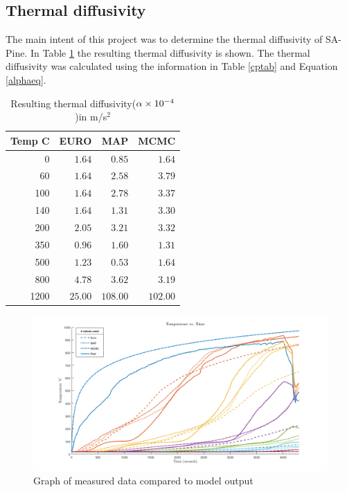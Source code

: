 \subsection{Thermal diffusivity}
The main intent of this project was to determine the thermal diffusivity of SA-Pine. 
In Table \ref{diffrestab} the resulting thermal diffusivity is shown.
The thermal diffusivity was calculated using the information in Table \ref{cptab} and Equation \ref{alphaeq}.

\begin{table}[H]
\centering
	\caption{Resulting thermal diffusivity($\alpha \times 10^{-4}$)in m/s$^2$ }
	 \label{diffrestab}
	\begin{tabular}{ r r r r }
	\toprule
	Temp \textdegree C & EURO & MAP & MCMC\\
	\midrule
	0&   $1.64$&	$0.85$&	$1.64$\\
	60&  $1.64$&	$2.58$&	$3.79$\\
	100& $1.64$&	$2.78$&	$3.37$\\\
	140& $1.64$&	$1.31$&	$3.30$\\
	200& $2.05$&	$3.21$&	$3.32$\\
	350& $0.96$&	$1.60$&	$1.31$\\
	500& $1.23$&	$0.53$&	$1.64$\\
	800& $4.78$&	$3.62$&	$3.19$\\
	1200& $25.00$&	$108.00$&	$102.00$\\
	\bottomrule	
	\end{tabular}
	
\end{table}

\begin{figure}
	
	\centering
	\includegraphics[width=\linewidth,]{figures/final_graph.png}
	\caption{Graph of measured data compared to model output}
	\label{final_graph}
\end{figure}





